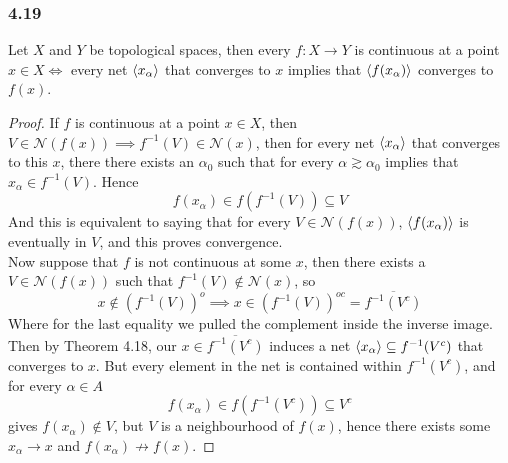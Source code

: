 \documentclass[../../main.tex]{subfiles}
\begin{document}
\subsubsection*{4.19}
\begin{wts}
Let $X$ and $Y$ be topological spaces, then every $f:X\to Y$ is continuous at a point $x\in X\iff$ every net $\langle {x_\alpha} \rangle$ that converges to $x$ implies that $\langle {f(x_\alpha)} \rangle$ converges to $f(x)$.
\end{wts}
\newcommand{\n}[1]{\mathcal{N}({#1})}
\begin{proof}
If $f$ is continuous at a point $x\in X$, then $V\in\n{f(x)}\implies f^{-1}(V)\in\n{x}$, then for every net $\langle {x_\alpha} \rangle$ that converges to this $x$, there there exists an $\alpha_0$ such that for every $\alpha\gtrsim\alpha_0$ implies that $x_\alpha\in f^{-1}(V)$. Hence 
\[
f(x_\alpha)\in f\left(f^{-1}(V)\right)\subseteq V
\]
And this is equivalent to saying that for every $V\in\n{f(x)}$, $\langle {f(x_\alpha)} \rangle$ is eventually in $V$, and this proves convergence.\\

Now suppose that $f$ is not continuous at some $x$, then there exists a $V\in\n{f(x)}$ such that $f^{-1}(V)\notin\n{x}$, so 
\[
x\notin \left(f^{-1}(V)\right)^o\implies x\in \left(f^{-1}(V)\right)^{oc}=\overline{f^{-1}(V^c)}
\]
Where for the last equality we pulled the complement inside the inverse image. Then by Theorem 4.18, our $x\in\overline{f^{-1}(V^c)}$ induces a net $\langle {x_\alpha} \rangle\subseteq f^{-1}(V^c)$ that converges to $x$. But every element in the net is contained within $f^{-1}(V^c)$, and for every $\alpha\in A$
\[
f(x_\alpha)\in f\left(f^{-1}(V^c)\right)\subseteq V^c
\]
gives $f(x_\alpha)\notin V$, but $V$ is a neighbourhood of $f(x)$, hence there exists some $x_\alpha\to x$ and $f(x_\alpha)\not\to f(x)$.
\end{proof}
\end{document}
